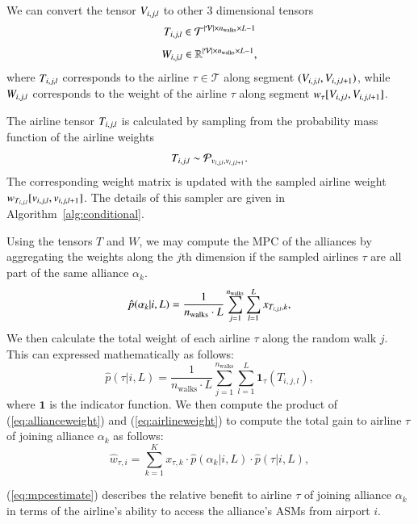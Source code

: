 \documentclass[preprint,times]{elsarticle}
\def\mkhalil#1{{\color{black} #1}}
\begin{document}
We can convert the tensor $V_{i,j,\mkhalil{l}}$ to other 3 dimensional tensors 
%
\[{T}_{i,j,\mkhalil{l}} \in \mathcal{T}^{\lvert\mathcal{V}\rvert\times n_\text{walks} \times L-1}\]
\[{W}_{i,j,\mkhalil{l}} \in \mathbb{R}^{\lvert\mathcal{V}\rvert\times n_\text{walks} \times L-1},\]
%
where ${T}_{i,j,\mkhalil{l}}$ corresponds to the \mkhalil{airline} $\tau \in \mathcal{T}$ along segment $({V}_{i,j,\mkhalil{l}}, {V}_{i,j,\mkhalil{l+1}})$, while ${W}_{i,j,\mkhalil{l}}$ corresponds to the weight of the \mkhalil{airline} $\tau$ along segment $w_\tau[{V}_{i,j,\mkhalil{l}}, {V}_{i,j,\mkhalil{l+1}}]$.

The \mkhalil{airline} tensor ${T}_{i,j,\mkhalil{l}}$ is calculated by sampling from the probability mass function of the \mkhalil{airline} weights
%
\[T_{i,j,\mkhalil{l}}\sim\mathcal{P}_{v_{i,j,\mkhalil{l}},v_{i,j,\mkhalil{l}+1}}.\]
%
The corresponding weight matrix is updated with the sampled \mkhalil{airline} weight $w_{T_{i,j,\mkhalil{l}}}[v_{i,j,\mkhalil{l}},v_{i,j,\mkhalil{l}+1}]$. The details of this sampler are given in Algorithm~\ref{alg:conditional}.

Using the tensors $T$ and $W$, we may compute the \ac{MPC} of the alliances by aggregating the weights along the $j$th dimension if the \mkhalil{sampled airline}s $\tau$ are all part of the same alliance $\alpha_k$. 
%
\begin{equation} \label{eq:allianceweight}
\hat{p}(\alpha_k|i,L) = \dfrac{1}{n_\text{walks}\cdot L}\sum_{j=1}^{n_\text{walks}}\sum_{l=1}^{L}\mkhalil{x_{T_{i,j,l},k}},
\end{equation}
%
We then calculate the total weight of each airline $\tau$ along the random walk $j$. This can expressed mathematically as follows:
%
\begin{equation} \label{eq:airlineweight}
\hat{p}(\tau|i,L) = \dfrac{1}{n_\text{walks}\cdot L}\sum_{j=1}^{n_\text{walks}}\sum_{l=1}^{L}\mathbf{1}_\tau\left(T_{i,j,l}\right),
\end{equation}
%
\mkhalil{where $\mathbf{1}$ is the indicator function.} We then compute the product of (\ref{eq:allianceweight}) and (\ref{eq:airlineweight}) to compute the total gain to airline $\tau$ of joining alliance $\alpha_k$ as follows:
%
\begin{equation} \label{eq:mpcestimate}
\hat{w}_{\tau,i} = \sum_{k=1}^{K}x_{\tau,k} \cdot \hat{p}(\alpha_k|i,L)\cdot \hat{p}(\tau|i,L),
\end{equation}

(\ref{eq:mpcestimate}) describes the relative benefit to airline $\tau$ of joining alliance $\alpha_k$ in terms of the airline's ability to access the alliance's \acp{ASM} from airport $i$.
\end{document}
